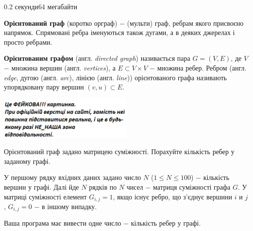 \begin{problem}{}{}{}{0.2 секунди}{64 мегабайти}

{\bf {Орієнтований граф}} (коротко орграф) $-$ (мульти) граф, ребрам якого присвоєно напрямок. 
Спрямовані ребра іменуються також дугами, а в деяких джерелах і просто ребрами. 

{\bf {Орієнтованим графом}} (англ. {\emph{directed graph}}) називається пара $G=(V,E)$, де $V$ $-$ множина вершин 
(англ. {\emph{vertices}}), а $E \subset V \times V$ $-$ множина ребер. 
Ребром (англ. {\emph{edge}}, дугою (англ. {\emph{arc}}), лінією (англ. {\emph{line}})) орієнтованого графа 
називають упорядковану пару вершин $(v,u) \subset E$.

 \begin{center}
    \includegraphics[width=0.50\textwidth,natwidth=232,natheight=217]{pic.png}
  \end{center}


Орієнтований граф задано матрицею суміжності. Порахуйте кількість ребер у заданому графі.

\InputFile
У першому рядку вхідних даних задано число $N$ ($1 \le N \le 100$) $-$ кількість вершин у графі.
Далі йде $N$ рядків по $N$ чисел $-$ матриця суміжності графа $G$. У матриці суміжності елемент $G_{i,j}=1$, якщо
існує ребро, що з'єднує вершини $i$ и $j$, $G_{i,j}=0$ $-$ в іншому випадку.

\OutputFile
Ваша програма має вивести одне число $-$ кількість ребер у графі.

\Example

\begin{example}
%
\end{example}

\end{problem}

